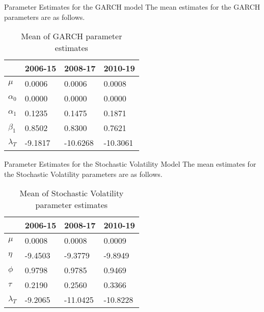 \documentclass[11pt]{beamer}
\begin{document}
\begin{frame}{Parameter Estimates for the GARCH model}
The mean estimates for the GARCH parameters are as follows.
\begin{table}[!ht]
    \centering
    \begin{tabular}{|l|l|l|l|}
    \hline
        ~ & \textbf{2006-15} & \textbf{2008-17} & \textbf{2010-19} \\ \hline
        \textbf{$\mu$}& 0.0006 & 0.0006 & 0.0008 \\ \hline
        \textbf{$\alpha_0$} & 0.0000 & 0.0000 & 0.0000 \\ \hline
        \textbf{$\alpha_1$} & 0.1235 & 0.1475 & 0.1871 \\ \hline
        \textbf{$\beta_1$} & 0.8502 & 0.8300 & 0.7621 \\ \hline
       \textbf{$\lambda_T$} & -9.1817 & -10.6268 & -10.3061 \\ \hline
       
    \end{tabular}
\caption{Mean of GARCH parameter estimates}
\end{table}
\end{frame}

\begin{frame}{Parameter Estimates for the Stochastic Volatility Model}
The mean estimates for the Stochastic Volatility parameters are as follows.
\begin{table}[!ht]
    \centering
    \begin{tabular}{|l|l|l|l|}
    \hline
        ~ & \textbf{2006-15} & \textbf{2008-17} & \textbf{2010-19} \\ \hline
        \textbf{$\mu$}& 0.0008 & 0.0008 & 0.0009 \\ \hline
        \textbf{$\eta$} & -9.4503 & -9.3779 & -9.8949 \\ \hline
        \textbf{$\phi$} & 0.9798 & 0.9785 & 0.9469 \\ \hline
        \textbf{$\tau$} & 0.2190 & 0.2560 & 0.3366 \\ \hline
       \textbf{$\lambda_T$} & -9.2065 & -11.0425 & -10.8228 \\ \hline
       
    \end{tabular}
\caption{Mean of Stochastic Volatility parameter estimates}
\end{table}
\end{frame}
\end{document}
